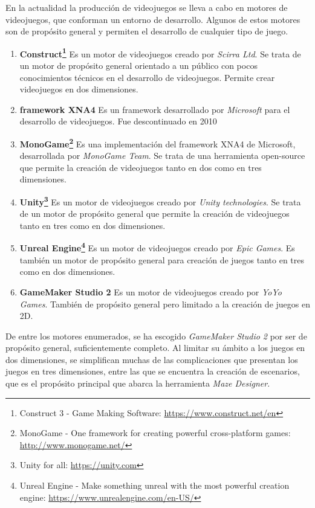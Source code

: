 En la actualidad la producción de videojuegos se lleva a cabo en motores de videojuegos, que conforman un entorno de desarrollo. Algunos de estos motores son de propósito general y permiten el desarrollo de cualquier tipo de juego.
\begin{enumerate}
	\item \textbf{Construct\footnote{Construct 3 - Game Making Software: \url{https://www.construct.net/en}}} Es un motor de videojuegos creado por \textit{Scirra Ltd}. Se trata de un motor de propósito general orientado a un público con pocos conocimientos técnicos en el desarrollo de videojuegos. Permite crear videojuegos en dos dimensiones.
	\item \textbf{framework XNA4\cite{xna4}} Es un framework desarrollado por \textit{Microsoft} para el desarrollo de videojuegos. Fue descontinuado en 2010
	\item \textbf{MonoGame\footnote{MonoGame - One framework for creating powerful cross-platform games: \url{http://www.monogame.net/}}} Es una implementación del framework XNA4 de Microsoft, desarrollada por \textit{MonoGame Team}. Se trata de una herramienta open-source que permite la creación de videojuegos tanto en dos como en tres dimensiones.
	\item \textbf{Unity\footnote{Unity for all: \url{https://unity.com}}} Es un motor de videojuegos creado por \textit{Unity technologies}. Se trata de un motor de propósito general que permite la creación de videojuegos tanto en tres como en dos dimensiones.
	\item \textbf{Unreal Engine\footnote{Unreal Engine - Make something unreal with the most powerful creation engine: \url{https://www.unrealengine.com/en-US/}}} Es un motor de videojuegos creado por \textit{Epic Games}. Es también un motor de propósito general para creación de juegos tanto en tres como en dos dimensiones.
	\item \textbf{GameMaker Studio 2\cite{gamemaker}} Es un motor de videojuegos creado por \textit{YoYo Games}. También de propósito general pero limitado a la creación de juegos en 2D.
\end{enumerate}

De entre los motores enumerados, se ha escogido \textit{GameMaker Studio 2} por ser de propósito general, suficientemente completo. Al limitar su ámbito a los juegos en dos dimensiones, se simplifican muchas de las complicaciones que presentan los juegos en tres dimensiones, entre las que se encuentra la creación de escenarios, que es el propósito principal que abarca la herramienta \textit{Maze Designer}.